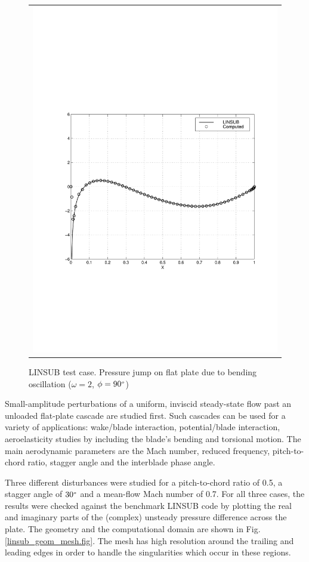 \begin{figure}
\begin{center}
\begin{tabular}{c}
{        \includegraphics[width=110mm,clip=t]{CHAP_LINEAR/FIGURE/lins_bend2.pdf}}
   \end{tabular}
 \end{center}
 \vspace{-8mm}
 \caption{LINSUB test case. Pressure jump on flat plate due to bending oscillation
          ($\omega = 2$, $\phi = 90^{\mbox{\tiny $o$}}$)}
 \label{linsub_bend.fig}
\end{figure}
%
%
 Small-amplitude perturbations of a uniform, inviscid steady-state flow past an
 unloaded flat-plate cascade are studied first.  Such cascades can  be used for a
 variety of applications: wake/blade interaction, potential/blade interaction, aeroelasticity
 studies by including the blade's bending and torsional motion. The main aerodynamic
 parameters are the Mach number, reduced frequency, pitch-to-chord ratio, stagger
 angle and the interblade phase angle.

 Three different disturbances were studied for  a pitch-to-chord ratio of 0.5,
 a stagger angle of $30^{\mbox{\tiny $o$}}$ and a mean-flow Mach number of 0.7.
 For all three cases, the results were checked against the benchmark LINSUB code
 by plotting the real and imaginary parts of the (complex) unsteady pressure difference across
 the plate.  The geometry and the computational domain  are
 shown in Fig. \ref{linsub_geom_mesh.fig}. The mesh has high resolution around the
 trailing and leading edges in order to handle the singularities which occur
 in these regions.

